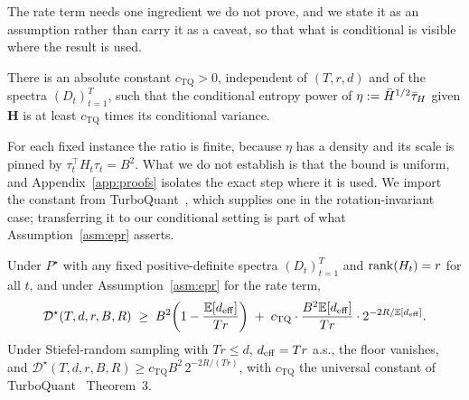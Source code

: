 The rate term needs one ingredient we do not prove, and we state it as an
assumption rather than carry it as a caveat, so that what is conditional is
visible where the result is used.

\begin{assumption}\label{asm:epr}
There is an absolute constant $c_{\mathrm{TQ}} > 0$, independent of
$(T, r, d)$ and of the spectra $(D_t)_{t=1}^T$, such that the conditional
entropy power of $\eta := \bar H^{1/2}\bar{\tau}_H$ given $\boldsymbol H$ is at least
$c_{\mathrm{TQ}}$ times its conditional variance.
\end{assumption}

For each fixed instance the ratio is finite, because $\eta$ has a density and
its scale is pinned by $\tau_t^\top H_t \tau_t = B^2$. What we do not establish
is that the bound is uniform, and Appendix~\ref{app:proofs} isolates the exact
step where it is used. We import the constant from
TurboQuant~\citep{zandieh2025turboquant}, which supplies one in the
rotation-invariant case; transferring it to our conditional setting is part of
what Assumption~\ref{asm:epr} asserts.

\begin{theorem}\label{thm:general}
Under $P^\star$ with any fixed positive-definite spectra
$(D_t)_{t=1}^T$ and $\operatorname{rank}(H_t) = r$ for all $t$, and under
Assumption~\ref{asm:epr} for the rate term,
\begin{equation}\label{eq:thm-lb}
  \mathcal{D}^\star(T, d, r, B, R)
  \;\geq\;
  B^2\!\left(1 - \frac{\mathbb{E}[d_{\mathrm{eff}}]}{Tr}\right)
  \;+\; c_{\mathrm{TQ}}\cdot\frac{B^2\mathbb{E}[d_{\mathrm{eff}}]}{Tr}
  \cdot 2^{-2R/\mathbb{E}[d_{\mathrm{eff}}]}.
\end{equation}
Under Stiefel-random sampling with $Tr\leq d$, $d_{\mathrm{eff}} = Tr$ a.s., the
floor vanishes, and
$\mathcal{D}^\star(T,d,r,B,R) \geq c_{\mathrm{TQ}} B^2\,
2^{-2R/(Tr)}$, with $c_{\mathrm{TQ}}$ the universal constant of
TurboQuant~\citep{zandieh2025turboquant} Theorem~3.
\end{theorem}

